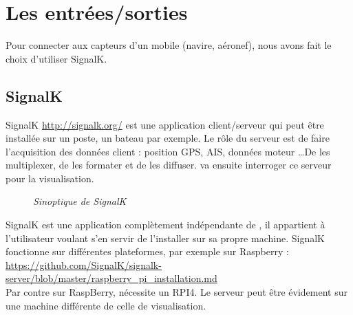 \chapter{Les entrées/sorties}
Pour connecter \nav aux capteurs d'un mobile (navire, aéronef), nous avons fait le choix d'utiliser SignalK.
\section{SignalK}
SignalK  \href{http://signalk.org/}{http://signalk.org/} est une application client/serveur qui peut être installée sur un poste, un bateau par exemple. Le rôle du serveur est de faire l'acquisition  des données  client : position GPS, AIS, données moteur \ldots De les multiplexer, de les formater et de les diffuser. \nav va ensuite interroger ce serveur pour la visualisation.
\begin{center}
\begin{figure}[ht]
\caption{\label{sinoptique}\textit{Sinoptique de SignalK}}
\end{figure}
\end{center}
SignalK est une application complètement indépendante de \nav, il appartient à l'utilisateur voulant
s'en servir de l'installer sur sa propre machine.
SignalK fonctionne sur différentes plateformes, par exemple sur Raspberry : \\
 \href{https://github.com/SignalK/signalk-server/blob/master/raspberry\_pi\_installation.md}{
 https://github.com/SignalK/signalk-server/blob/master/raspberry\_pi\_installation.md} \\
 Par contre sur RaspBerry, \nav nécessite un RPI4. Le serveur \nav peut être évidement sur une machine différente de celle de visualisation.
